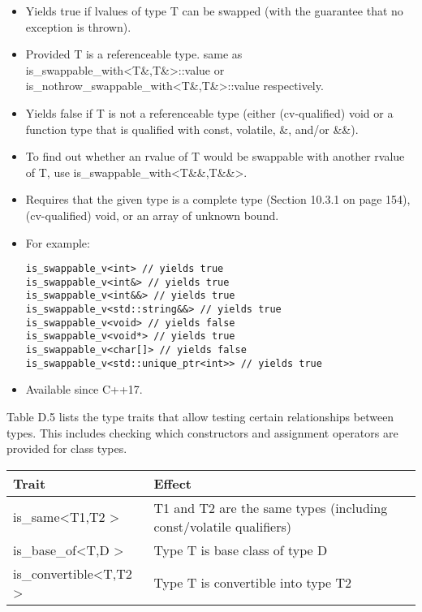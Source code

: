 \begin{itemize}
\item
Yields true if lvalues of type T can be swapped (with the guarantee that no exception is thrown).

\item
Provided T is a referenceable type. same as is\_swappable\_with<T\&,T\&>::value or is\_nothrow\_swappable\_with<T\&,T\&>::value respectively.

\item
Yields false if T is not a referenceable type (either (cv-qualified) void or a function type that is qualified with const, volatile, \&, and/or \&\&).

\item
To find out whether an rvalue of T would be swappable with another rvalue of T, use is\_swappable\_with<T\&\&,T\&\&>.

\item
Requires that the given type is a complete type (Section 10.3.1 on page 154), (cv-qualified) void, or an array of unknown bound.

\item
For example:
\begin{lstlisting}[style=styleCXX]
is_swappable_v<int> // yields true
is_swappable_v<int&> // yields true
is_swappable_v<int&&> // yields true
is_swappable_v<std::string&&> // yields true
is_swappable_v<void> // yields false
is_swappable_v<void*> // yields true
is_swappable_v<char[]> // yields false
is_swappable_v<std::unique_ptr<int>> // yields true
\end{lstlisting}

\item
Available since C++17.
\end{itemize}


Table D.5 lists the type traits that allow testing certain relationships between types. This includes checking which constructors and assignment operators are provided for class types.

\begin{table}[H]
	\begin{center}
	\begin{tabular}{l|l}
		\hline
		\textbf{Trait}                                & \textbf{Effect}                                                    \\ \hline
		is\_same\textless{}T1,T2 \textgreater{}       & T1 and T2 are the same types (including const/volatile qualifiers) \\ \hline
		is\_base\_of\textless{}T,D \textgreater{}     & Type T is base class of type D                                     \\ \hline
		is\_convertible\textless{}T,T2 \textgreater{} & Type T is convertible into type T2                                 \\ \hline
	\end{tabular}
	\end{center}
\end{table}

